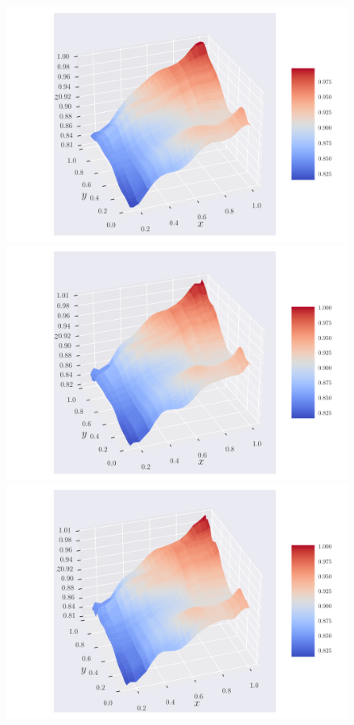 \documentclass[reprint,english,notitlepage,aps,nobalancelastpage,nofootinbib]{revtex4-1}  %
\begin{document}
\begin{figure}[h]
	\includegraphics[width=\linewidth]{SRTM_prediction_p10.pdf}
	\endminipage\hfill
	\includegraphics[width=\linewidth]{SRTM_prediction_p20.pdf}
	\endminipage\hfill
	\includegraphics[width=\linewidth]{SRTM_prediction_p30.pdf}

\end{figure}
\end{document}
